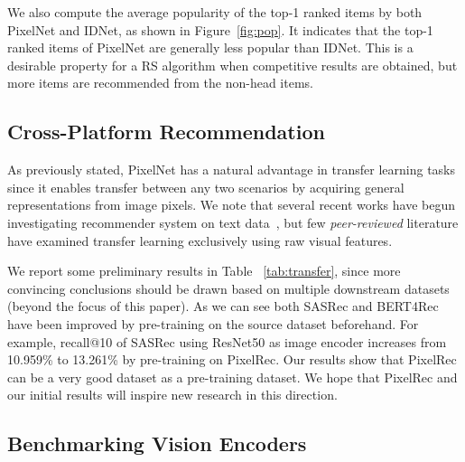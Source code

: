 \documentclass[sigconf]{acmart}
\begin{document}
We also compute the average popularity of the top-1 ranked items by both PixelNet and IDNet, as shown in Figure~\ref{fig:pop}. It indicates that the top-1 ranked items of PixelNet are  generally less popular than IDNet. This is a desirable property for a RS algorithm when competitive results are obtained, but more items are recommended from the non-head items.

	

\subsection{Cross-Platform Recommendation} 
As previously stated, PixelNet has a natural advantage in transfer learning tasks since it enables transfer between any two scenarios by acquiring general representations from image pixels.
We note that several recent works have begun  investigating  recommender system on text data~\cite{ding2021zero,hou2022towards,hou2022learning,shin2021one4all}, but few   \textit{peer-reviewed}  literature  have examined  transfer learning exclusively using raw visual features.

We report some preliminary results in Table ~\ref{tab:transfer}, since more convincing conclusions should be drawn based on multiple downstream datasets (beyond the focus of this paper). 
As we can see both SASRec and BERT4Rec have been improved by pre-training on the source dataset beforehand. For example,
recall@10 of SASRec using ResNet50 as image encoder increases from 10.959\% to 13.261\% by pre-training on PixelRec. Our results show that PixelRec can be a very good dataset as a pre-training dataset. We hope that PixelRec and our initial results will inspire new research in this direction.


\subsection{Benchmarking Vision Encoders}
\end{document}
